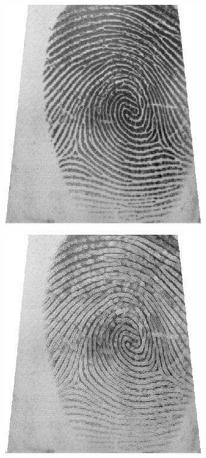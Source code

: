 \documentclass{beamer}
\begin{document}
{\begin{figure}[!ht]
\begin{subfigure}[ht]{0.15\textwidth}
        \end{subfigure}
    \end{figure}
    \begin{figure}[!ht]
        \centering
        \begin{subfigure}[ht]{0.15\textwidth}
            \includegraphics[width=\textwidth]{fingerprints/2004Db2a/1_3_src.jpg}
        \end{subfigure}
        \qquad
        \begin{subfigure}[ht]{0.15\textwidth}
            \includegraphics[width=\textwidth]{fingerprints/2004Db2a/1_3_background.jpg}

\end{subfigure}
\end{figure}}
\end{document}
